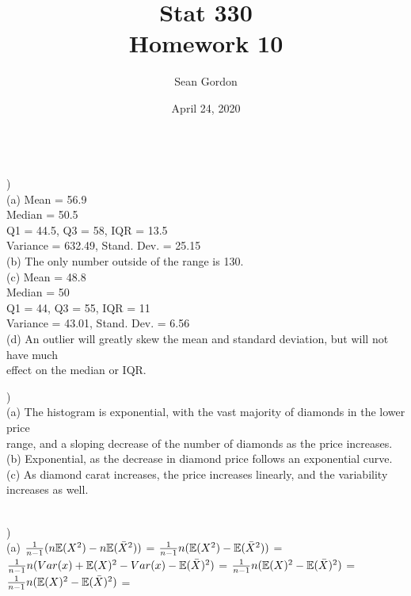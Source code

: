 \documentclass[12pt]{article}
\title{Stat 330\\Homework 10}
\author{Sean Gordon}
\date{April 24, 2020}
\begin{document}
\maketitle


\noindent\hrulefill \\[-.8em]


)\\
\indent (a) Mean = 56.9\\
\indent \indent Median = 50.5\\
\indent \indent Q1 = 44.5, Q3 = 58, IQR = 13.5\\
\indent \indent Variance = 632.49, Stand. Dev. = 25.15\\

\indent (b) The only number outside of the range is 130.\\

\indent (c) Mean = 48.8\\
\indent \indent Median = 50\\
\indent \indent Q1 = 44, Q3 = 55, IQR = 11\\
\indent \indent Variance = 43.01, Stand. Dev. = 6.56\\

\indent (d) An outlier will greatly skew the mean and standard deviation, but will not have much\\
\indent \indent effect on the median or IQR.\\


\noindent \hrulefill 


)\\
\indent (a) The histogram is exponential, with the vast majority of diamonds in the lower price \\
\indent \indent range, and a sloping decrease of the number of diamonds as the price increases.\\

\indent (b) Exponential, as the decrease in diamond price follows an exponential curve.\\

\indent (c) As diamond carat increases, the price increases linearly, and the variability \\
\indent \indent increases as well.\\


\noindent \hrulefill \\
\pagebreak


)\\
\indent (a) ${\Large \frac{1}{n-1}}(n\mathbb{E}(X^2) - n\mathbb{E}(\bar{X}^2))$ = ${\Large \frac{1}{n-1}}n(\mathbb{E}(X^2) - \mathbb{E}(\bar{X}^2))$ = \\[.4em]
\indent \indent ${\Large \frac{1}{n-1}}n(Var(x) + \mathbb{E}(X)^2 - Var(x) - \mathbb{E}(\bar{X})^2)$ = ${\Large \frac{1}{n-1}}n(\mathbb{E}(X)^2 - \mathbb{E}(\bar{X})^2)$ = \\[.4em]
\indent \indent ${\Large \frac{1}{n-1}}n(\mathbb{E}(X)^2 - \mathbb{E}(\bar{X})^2)$ = \\
\end{document}
